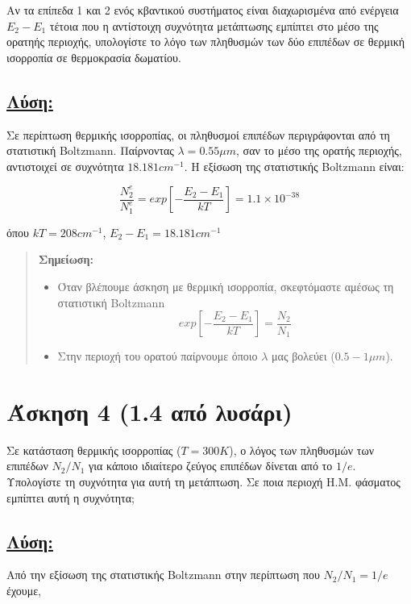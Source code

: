 \documentclass[a4paper,11pt,titlepage]{article}
\begin{document}
Αν τα επίπεδα 1 και 2 ενός κβαντικού συστήματος είναι διαχωρισμένα από ενέργεια $E_2-E_1$ τέτοια που η αντίστοιχη συχνότητα μετάπτωσης εμπίπτει στο μέσο της ορατηής περιοχής, υπολογίστε το λόγο των πληθυσμών των δύο επιπέδων σε θερμική ισορροπία σε θερμοκρασία δωματίου.

\subsection*{\underline{Λύση:}}
Σε περίπτωση θερμικής ισορροπίας, οι πληθυσμοί επιπέδων περιγράφονται από τη στατιστική Boltzmann. Παίρνοντας $\lambda=0.55{\mu}m$, σαν το μέσο της ορατής περιοχής, αντιστοιχεί σε συχνότητα $18.181cm^{-1}$. Η εξίσωση της στατιστικής Boltzmann είναι:

\begin{equation}
\frac{N^e_2}{N^e_1}=exp[-\frac{E_2-E_1}{kT}]=1.1\times10^{-38}
\end{equation}

όπου $kT=208cm^{-1}$, $E_2-E_1=18.181cm^{-1}$

\begin{quote}
 \textbf{Σημείωση:} 
\begin{itemize}
 \item Όταν βλέπουμε άσκηση με θερμική ισορροπία, σκεφτόμαστε αμέσως τη στατιστική Boltzmann
\begin{equation}
exp[-\dfrac{E_2-E_1}{kT}]=\dfrac{N_2}{N_1}
\end{equation}
 \item Στην περιοχή του ορατού παίρνουμε όποιο $\lambda$ μας βολεύει ($0.5-1{\mu}m$).
\end{itemize}
\end{quote}

\newpage
\section{Άσκηση 4 (1.4 από λυσάρι)}

Σε κατάσταση θερμικής ισορροπίας ($T=300K$), ο λόγος των πληθυσμών των επιπέδων $N_2/N_1$ για κάποιο ιδιαίτερο ζεύγος επιπέδων δίνεται από το $1/e$. Υπολογίστε τη συχνότητα για αυτή τη μετάπτωση. Σε ποια περιοχή Η.Μ. φάσματος εμπίπτει αυτή η συχνότητα;

\subsection*{\underline{Λύση:}}

Από την εξίσωση της στατιστικής Boltzmann στην περίπτωση που $N_2/N_1=1/e$ έχουμε,
\end{document}
